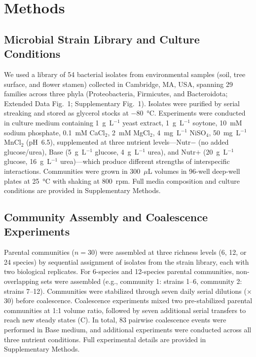\section{Methods}
\label{sec:methods}

\subsection*{Microbial Strain Library and Culture Conditions}
\label{sec:methods:strains}

We used a library of 54 bacterial isolates from environmental samples (soil, tree surface, and flower stamen) collected in Cambridge, MA, USA, spanning 29 families across three phyla (Proteobacteria, Firmicutes, and Bacteroidota; Extended Data Fig.~1; Supplementary Fig.~1). Isolates were purified by serial streaking and stored as glycerol stocks at $-80$~°C. Experiments were conducted in culture medium containing 1~g~L$^{-1}$ yeast extract, 1~g~L$^{-1}$ soytone, 10~mM sodium phosphate, 0.1~mM CaCl$_2$, 2~mM MgCl$_2$, 4~mg~L$^{-1}$ NiSO$_4$, 50~mg~L$^{-1}$ MnCl$_2$ (pH~6.5), supplemented at three nutrient levels---Nutr$-$ (no added glucose/urea), Base (5~g~L$^{-1}$ glucose, 4~g~L$^{-1}$ urea), and Nutr$+$ (20~g~L$^{-1}$ glucose, 16~g~L$^{-1}$ urea)---which produce different strengths of interspecific interactions. Communities were grown in 300~$\mu$L volumes in 96-well deep-well plates at 25~°C with shaking at 800~rpm. Full media composition and culture conditions are provided in Supplementary Methods.


\subsection*{Community Assembly and Coalescence Experiments}
\label{sec:methods:coalescence}

Parental communities ($n = 30$) were assembled at three richness levels (6, 12, or 24 species) by sequential assignment of isolates from the strain library, each with two biological replicates. For 6-species and 12-species parental communities, non-overlapping sets were assembled (e.g., community 1: strains 1--6, community 2: strains 7--12). Communities were stabilized through seven daily serial dilutions ($\times$30) before coalescence. Coalescence experiments mixed two pre-stabilized parental communities at 1:1 volume ratio, followed by seven additional serial transfers to reach new steady states (C). In total, 83 pairwise coalescence events were performed in Base medium, and additional experiments were conducted across all three nutrient conditions. Full experimental details are provided in Supplementary Methods.


